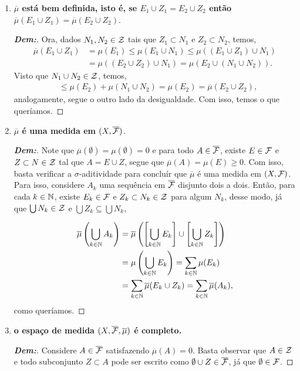 \begin{enumerate}[label=(\alph*), wide, labelindent=0pt]
  \item \textbf{$\overline \mu$ está bem definida, isto é, 
    se $E_1 \cup Z_1 = E_2 \cup Z_2$ então $\overline \mu (E_1 \cup Z_1) = 
    \overline \mu (E_2 \cup Z_2)$}.
    \begin{proof}[\textbf{Dem:}]Ora, dados $N_1, N_2 \in \mathcal Z$ tais que $Z_1 \subset N_1$ 
      e $Z_2 \subset N_2$, temos,
      \begin{align*}
        \overline{\mu}(E_1\cup Z_1) &= \mu(E_1) \le \mu(E_1 \cup N_1)
        \le \mu((E_1 \cup Z_1) \cup N_1)\\
        &=\mu((E_2 \cup Z_2) \cup N_1) = \mu(E_2 \cup (N_1 \cup N_2)).
      \end{align*}
      Visto que $N_1 \cup N_2 \in \mathcal Z$, temos,
      \begin{align*}
        &\le\mu(E_2) + \mu(N_1 \cup N_2) = \mu(E_2) = \overline{\mu}(E_2 \cup Z_2), 
      \end{align*}
      analogamente, segue o outro lado da desigualdade. Com isso, temos o que queríamos.
    \end{proof}
  \item \textbf{$\overline \mu$ é uma medida em $(X, \overline{\mathcal F})$}. 
    \begin{proof}[\textbf{Dem:}]
      Note que $\overline\mu(\emptyset) = \mu(\emptyset) = 0$ e para todo $A \in 
      \overline{\mathcal F}$, existe $E \in \mathcal F$ e $Z \subset N \in \mathcal Z$ tal que 
      $A = E \cup Z$, 
      segue que $\overline \mu(A) = \mu(E) \ge 0$. Com isso, basta verificar a 
      $\sigma$-aditividade para concluír que $\overline \mu$ é uma medida em $(X, \mathcal F)$.
      Para isso, considere ${A_k}$ uma sequência em $\overline{\mathcal F}$ 
      disjunto dois a dois. Então, para 
      cada $k \in \mathbb N$, existe $E_k \in \mathcal F$ e $Z_k \subset N_k \in \mathcal Z$ 
      para algum $N_k$, desse modo, já que $\bigcup N_k \in \mathcal Z$ e 
      $\bigcup Z_k \subseteq \bigcup N_k$, 

      \begin{align*}
        \overline \mu\left(\bigcup_{k \in \mathbb N} A_k \right) &=
        \overline\mu\left(\left[\bigcup_{k \in \mathbb N} E_k \right] \cup 
        \left[\bigcup_{k \in \mathbb N} Z_k \right]\right)\\ 
        &= \mu\left(\bigcup_{k \in \mathbb N} E_k\right) = 
        \sum_{k \in \mathbb N} \mu(E_k)\\
        &= \sum_{k \in \mathbb N} \overline \mu(E_k \cup Z_k)
        =\sum_{k \in \mathbb N} \overline \mu(A_k),
      \end{align*}
      como queríamos.
    \end{proof}
  \item \textbf{o espaço de medida $(X, \overline{\mathcal F}, \overline \mu)$ é completo.}
    \begin{proof}[\textbf{Dem:}] Considere $A \in \overline{\mathcal F}$ satisfazendo 
      $\overline{\mu}(A) = 0$. Basta observar que $A \in \mathcal Z$ e 
      todo subconjunto $Z \subset A$
      pode ser escrito como $\emptyset \cup Z \in \overline{\mathcal F}$, já que 
      $\emptyset \in \mathcal F$. 
            

\end{proof}
\end{enumerate}
